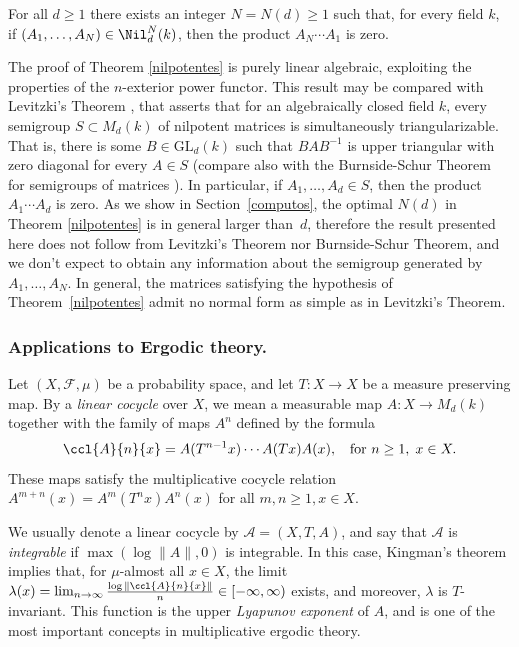 \begin{teo}\label{nilpotentes} For all $d\geq 1$ there exists an integer $N=N(d)\geq 1$ such that, for every field $k$, if $(A_1,\dots,A_N) \in \Nil_{d}^{N}(k)$, then the product $A_{N}\cdots A_{1}$ is zero.
\end{teo}
The proof of Theorem \ref{nilpotentes} is purely linear algebraic, exploiting the properties of the $n$-exterior power functor. This result may be compared with Levitzki's Theorem \cite[Th.\,2.1.7]{raro}, that asserts that for an algebraically closed field $k$, every semigroup $S\subset M_{d}(k)$ of nilpotent matrices is simultaneously triangularizable. That is, there is some $B\in \mathrm{GL}_{d}(k)$ such that $BAB^{-1}$ is upper triangular with zero diagonal for every $A \in S$ (compare also with the Burnside-Schur Theorem for semigroups of matrices \cite{mcnaugh}). In particular, if $A_1,\dots,A_d\in S$, then the product $A_1 \cdots A_d$ is zero. As we show in Section~\ref{computos}, the optimal $N(d)$ in Theorem \ref{nilpotentes} is in general larger than~$d$, therefore the result presented here does not follow from Levitzki's Theorem nor Burnside-Schur Theorem, and we don't expect to obtain any information about the semigroup generated by $A_1,\dots,A_N$. In general, the matrices satisfying the hypothesis of Theorem~\ref{nilpotentes} admit no normal form as simple as in Levitzki's Theorem.

\subsubsection*{Applications to Ergodic theory.} Let $(X,\mathcal{F},\mu)$ be a probability space, and let $T:X\rightarrow X$ be a measure preserving map. By a \textit{linear cocycle} over $X$, we mean a measurable map $A:X\rightarrow M_{d}(k)$ together with the family of maps $A^{n}$ defined by the formula
\begin{equation*}
\ccl{A}{n}{x}=A(T^{n-1}x)\cdots A(Tx)A(x), \hspace{2mm} \text{ for }n\geq 1,\;x\in X.
\end{equation*}
These maps satisfy the multiplicative cocycle relation $A^{m+n}(x)=A^{m}(T^{n}x)A^{n}(x)$ for all $m,n\geq 1,x \in X$.

We usually denote a linear cocycle by $\mathcal{A}=(X,T,A)$, and say that $\mathcal{A}$ is \textit{integrable} if $\max(\log{\|A\|},0)$ is integrable. In this case, Kingman's theorem implies that, for $\mu$-almost all $x\in X$, the limit $\lambda(x)=\lim_{n \to \infty}{\frac{\log{\|\ccl{A}{n}{x}\|}}{n}}\in [-\infty,\infty)$ exists, and moreover, $\lambda$ is $T$-invariant. This function is the upper \textit{Lyapunov exponent} of $A$, and is one of the most important concepts in multiplicative ergodic theory.

